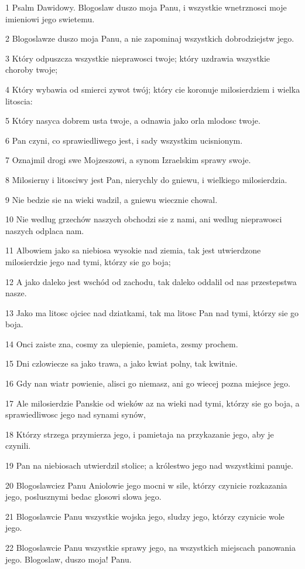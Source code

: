 \par 1 Psalm Dawidowy. Blogoslaw duszo moja Panu, i wszystkie wnetrznosci moje imieniowi jego swietemu.
\par 2 Blogoslawze duszo moja Panu, a nie zapominaj wszystkich dobrodziejstw jego.
\par 3 Który odpuszcza wszystkie nieprawosci twoje; który uzdrawia wszystkie choroby twoje;
\par 4 Który wybawia od smierci zywot twój; który cie koronuje milosierdziem i wielka litoscia:
\par 5 Który nasyca dobrem usta twoje, a odnawia jako orla mlodosc twoje.
\par 6 Pan czyni, co sprawiedliwego jest, i sady wszystkim ucisnionym.
\par 7 Oznajmil drogi swe Mojzeszowi, a synom Izraelskim sprawy swoje.
\par 8 Milosierny i litosciwy jest Pan, nierychly do gniewu, i wielkiego milosierdzia.
\par 9 Nie bedzie sie na wieki wadzil, a gniewu wiecznie chowal.
\par 10 Nie wedlug grzechów naszych obchodzi sie z nami, ani wedlug nieprawosci naszych odplaca nam.
\par 11 Albowiem jako sa niebiosa wysokie nad ziemia, tak jest utwierdzone milosierdzie jego nad tymi, którzy sie go boja;
\par 12 A jako daleko jest wschód od zachodu, tak daleko oddalil od nas przestepstwa nasze.
\par 13 Jako ma litosc ojciec nad dziatkami, tak ma litosc Pan nad tymi, którzy sie go boja.
\par 14 Onci zaiste zna, cosmy za ulepienie, pamieta, zesmy prochem.
\par 15 Dni czlowiecze sa jako trawa, a jako kwiat polny, tak kwitnie.
\par 16 Gdy nan wiatr powienie, alisci go niemasz, ani go wiecej pozna miejsce jego.
\par 17 Ale milosierdzie Panskie od wieków az na wieki nad tymi, którzy sie go boja, a sprawiedliwosc jego nad synami synów,
\par 18 Którzy strzega przymierza jego, i pamietaja na przykazanie jego, aby je czynili.
\par 19 Pan na niebiosach utwierdzil stolice; a królestwo jego nad wszystkimi panuje.
\par 20 Blogoslawciez Panu Aniolowie jego mocni w sile, którzy czynicie rozkazania jego, poslusznymi bedac glosowi slowa jego.
\par 21 Blogoslawcie Panu wszystkie wojska jego, sludzy jego, którzy czynicie wole jego.
\par 22 Blogoslawcie Panu wszystkie sprawy jego, na wszystkich miejscach panowania jego. Blogoslaw, duszo moja! Panu.


